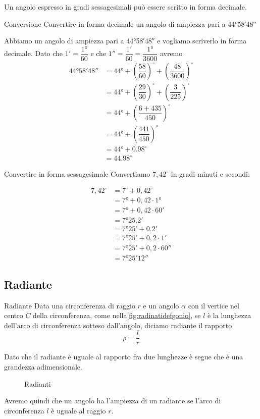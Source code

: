 Un angolo espresso in gradi sessagesimali può essere scritto in forma decimale. 
\begin{esempiot}{Conversione}{}
Convertire in forma decimale un angolo di ampiezza pari a \ang{44;58;48}
\end{esempiot}
 Abbiamo un angolo di ampiezza pari a \ang{44;58;48} e vogliamo
 scriverlo in forma decimale. Dato che $\ang{;1;}=\dfrac{\ang{1}}{60}$ e che $\ang{;;1}=\dfrac{\ang{;1;}}{60}=\dfrac{\ang{1}}{3600}$ avremo
\begin{align*}
	\ang{44;58;48}&=\ang{44}+\left(\dfrac{58}{60}\right)^{\circ}+\left(\dfrac{48}{3600} \right)^{\circ}\\
	&=\ang{44}+\left(\dfrac{29}{30}\right)^{\circ}+\left(\dfrac{3}{225} \right)^{\circ}\\
	&=\ang{44}+\left(\dfrac{6+435}{450} \right)^{\circ}\\
	&=\ang{44}+\left(\dfrac{441}{450} \right)^{\circ}\\
	&=\ang{44}+\num{0,98}^{\circ}\\
	&=\num{44,98}^{\circ}
\end{align*}
\begin{esempiot}{Convertire in forma sessagesimale}{}
Convertiamo $7,42^{\circ}$ in gradi minuti e secondi:
\end{esempiot}
\begin{align*}
	7,42^{\circ}&=7^{\circ}+0,42^{\circ}\\
	&=\ang{7}+0,42\cdot \ang{1}\\
	&=\ang{7}+0,42\cdot \ang{;60;}\\
	&=\ang{7;25,2;}\\
	&=\ang{7;25;}+\ang{;0,2;}\\
	&=\ang{7;25;}+0,2\cdot\ang{;1;}\\
	&=\ang{7;25;}+0,2\cdot\ang{;;60}\\
	&=\ang{7;25;12}
\end{align*} 

\subsection{Radiante}
\begin{definizionet}{Radiante}{}
Data una circonferenza di raggio $r$ e un angolo $\alpha$ con il vertice nel centro $C$ della circonferenza, come nella\nobs\vref{fig:radinatidefgonio}, se $l$ è la lunghezza dell'arco di circonferenza sotteso dall'angolo, diciamo radiante il rapporto \[\rho=\dfrac{l}{r} \]
\end{definizionet}
Dato che il radiante è uguale al rapporto fra due lunghezze è segue che è una grandezza adimensionale.
\begin{figure}
	\centering
	
	\caption{Radianti}
	\label{fig:radinatidefgonio}
\end{figure}
Avremo quindi che un angolo ha l'ampiezza di un radiante se l'arco di circonferenza $l$ è uguale al raggio $r$.

